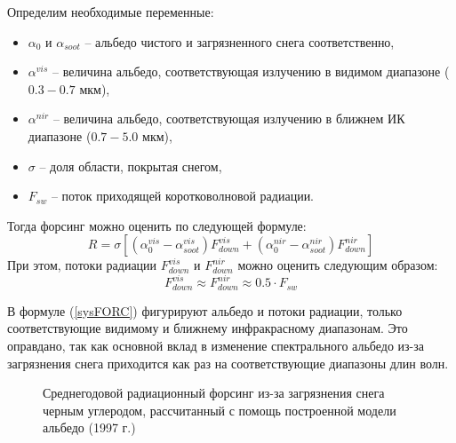 \documentclass[a4paper, fontsize=14pt]{scrartcl}
\begin{document}
Определим необходимые переменные:
\begin{itemize}
    \item $\alpha_{0}$ и $\alpha_{soot}$ -- альбедо чистого и загрязненного снега соответственно,
    \item $\alpha^{vis}$ -- величина альбедо, соответствующая излучению в видимом диапазоне ($0.3-0.7$ мкм),
    \item $\alpha^{nir}$ -- величина альбедо, соответствующая излучению в ближнем ИК диапазоне ($0.7-5.0$ мкм),
    \item $\sigma$ -- доля области, покрытая снегом,
    \item $F_{sw}$ -- поток приходящей коротковолновой радиации.
\end{itemize}
Тогда форсинг можно оценить по следующей формуле:
\begin{equation}
    R = \sigma [ (\alpha_{0}^{vis} - \alpha_{soot}^{vis})F_{down}^{vis} + (\alpha_{0}^{nir} - \alpha_{soot}^{nir})F_{down}^{nir} ] \label{sysFORC}  
\end{equation}
При этом, потоки радиации $F_{down}^{vis}$ и $F_{down}^{nir}$ можно оценить следующим образом: 
\begin{equation}
    F_{down}^{vis} \approx F_{down}^{nir} \approx 0.5 \cdot F_{sw} \label{sys}  
\end{equation}

В формуле (\ref{sysFORC}) фигурируют альбедо и потоки радиации, только соответствующие видимому и ближнему инфракрасному диапазонам. Это оправдано, так как основной вклад в изменение спектрального альбедо из-за загрязнения снега приходится как раз на соответствующие диапазоны длин волн.

\begin{figure}[h]
    \caption{Среднегодовой радиационный форсинг из-за загрязнения снега черным углеродом, рассчитанный с помощь построенной модели альбедо (1997 г.)}
    \label{fig:image}
\end{figure}
\end{document}
